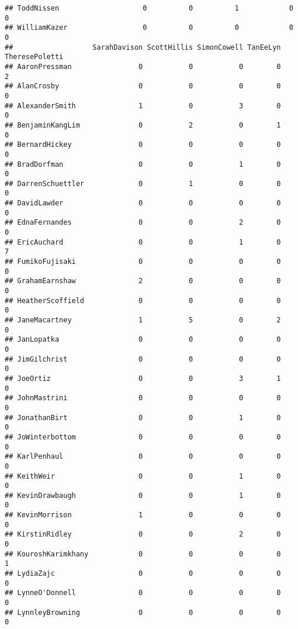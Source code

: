 \documentclass[
  12pt,
]{article}
\begin{document}
\begin{verbatim}
## ToddNissen                    0          0          1            0           0
## WilliamKazer                  0          0          0            0           0
##                   SarahDavison ScottHillis SimonCowell TanEeLyn TheresePoletti
## AaronPressman                0           0           0        0              2
## AlanCrosby                   0           0           0        0              0
## AlexanderSmith               1           0           3        0              0
## BenjaminKangLim              0           2           0        1              0
## BernardHickey                0           0           0        0              0
## BradDorfman                  0           0           1        0              0
## DarrenSchuettler             0           1           0        0              0
## DavidLawder                  0           0           0        0              0
## EdnaFernandes                0           0           2        0              0
## EricAuchard                  0           0           1        0              7
## FumikoFujisaki               0           0           0        0              0
## GrahamEarnshaw               2           0           0        0              0
## HeatherScoffield             0           0           0        0              0
## JaneMacartney                1           5           0        2              0
## JanLopatka                   0           0           0        0              0
## JimGilchrist                 0           0           0        0              0
## JoeOrtiz                     0           0           3        1              0
## JohnMastrini                 0           0           0        0              0
## JonathanBirt                 0           0           1        0              0
## JoWinterbottom               0           0           0        0              0
## KarlPenhaul                  0           0           0        0              0
## KeithWeir                    0           0           1        0              0
## KevinDrawbaugh               0           0           1        0              0
## KevinMorrison                1           0           0        0              0
## KirstinRidley                0           0           2        0              0
## KouroshKarimkhany            0           0           0        0              1
## LydiaZajc                    0           0           0        0              0
## LynneO'Donnell               0           0           0        0              0
## LynnleyBrowning              0           0           0        0              0

\end{verbatim}
\end{document}
